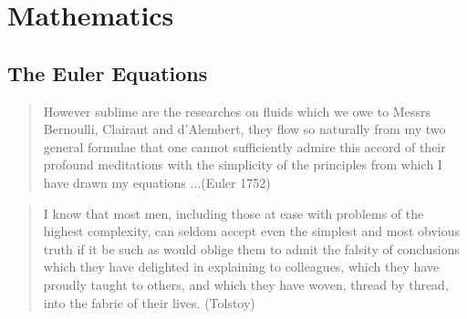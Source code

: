 
















   






     

  


\part{Mathematics}
    




\fi  %

\chapter{The Euler Equations}
\label{Euler}

\small
\begin{quote}
However sublime are the researches on fluids which we owe to 
Messrs Bernoulli, Clairaut and d'Alembert, they flow so naturally from 
my two general formulae that one cannot sufficiently admire this accord 
of their profound meditations with the simplicity of the principles from 
which I have drawn my equations ...(Euler 1752) 
\end{quote}
\begin{quote}
I know that most men, including those at ease with problems of the highest 
complexity, can seldom accept even the simplest and most obvious truth if 
it be such as would oblige them to admit the falsity of conclusions which 
they have delighted in explaining to colleagues, which they have proudly 
taught to others, and which they have woven, thread by thread, into the 
fabric of their lives. (Tolstoy)
\end{quote}
\normalsize

